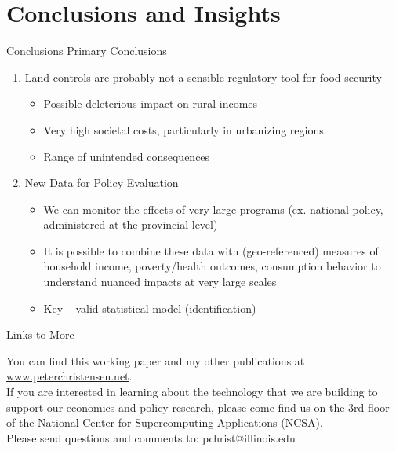 \documentclass[newPxFont]{beamer}
\begin{document}
%
%
\section{Conclusions and Insights}


\begin{frame}[c]{Conclusions}
	Primary Conclusions
	\begin{enumerate}   
		\item{Land controls are probably not a sensible regulatory tool for food security}  
		\begin{itemize}
			\item{Possible deleterious impact on rural incomes}
			\item{Very high societal costs, particularly in urbanizing regions}
			\item{Range of unintended consequences}
		\end{itemize}
		\item{New Data for Policy Evaluation}
		\begin{itemize}
			\item{We can monitor the effects of very large programs (ex. national policy, administered at the provincial level)}
			\item{It is possible to combine these data with (geo-referenced) measures of household income, poverty/health outcomes, consumption behavior to understand nuanced impacts at very large scales}
			\item{Key -- valid statistical model (identification)}
		\end{itemize}
	\end{enumerate}	
\end{frame}

%
%

\begin{frame}{Links to More}
	
You can find this working paper and my other publications at \url{www.peterchristensen.net}.\\
\vspace{1em}
If you are interested in learning about the technology that we are building to support our economics and policy research, please come find us on the 3rd floor of the National Center for Supercomputing Applications (NCSA).\\
\vspace{1em}	
Please send questions and comments to: pchrist@illinois.edu
\end{frame}
\end{document}
